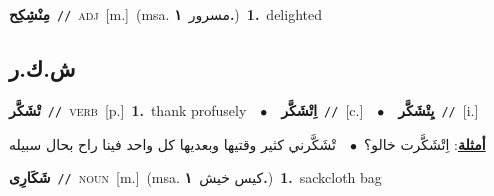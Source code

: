 \documentclass[10pt,a4paper,twoside]{article} %
\begin{document}
\begin{multicols}{2}
{\setlength\topsep{0pt}\textbf{\foreignlanguage{arabic}{مِنْشِكِح}}\ {\color{gray}\texttt{//}\color{black}}\ \textsc{adj}\ [m.]\ \color{gray}(msa. \foreignlanguage{arabic}{مسرور}~\foreignlanguage{arabic}{\textbf{١.}})\color{black}\ \textbf{1.}~delighted\ } \vspace{2mm}

\vspace{-3mm}
\subsection*{\color{blue}\foreignlanguage{arabic}{ش.ك.ر}\color{blue}{}} 

{\setlength\topsep{0pt}\textbf{\foreignlanguage{arabic}{تْشَكَّر}}\ {\color{gray}\texttt{//}\color{black}}\ \textsc{verb}\ [p.]\ \textbf{1.}~thank profusely\ \ $\bullet$\ \ \setlength\topsep{0pt}\textbf{\foreignlanguage{arabic}{اِتْشَكَّر}}\ {\color{gray}\texttt{//}\color{black}}\ [c.]\ \ $\bullet$\ \ \setlength\topsep{0pt}\textbf{\foreignlanguage{arabic}{يِتْشَكَّر}}\ {\color{gray}\texttt{//}\color{black}}\ [i.]\  \begin{flushright}\color{gray}\foreignlanguage{arabic}{\textbf{\underline{\foreignlanguage{arabic}{أمثلة}}}: اِتْشَكَّرت خالو؟\ $\bullet$\ \  تْشَكَّرني كثير وقتيها وبعديها كل واحد فينا راح بحال سبيله}\end{flushright}\color{black}} \vspace{2mm}

{\setlength\topsep{0pt}\textbf{\foreignlanguage{arabic}{شَكَارِى}}\ {\color{gray}\texttt{//}\color{black}}\ \textsc{noun}\ [m.]\ \color{gray}(msa. \foreignlanguage{arabic}{كيس خيش}~\foreignlanguage{arabic}{\textbf{١.}})\color{black}\ \textbf{1.}~sackcloth bag\ } \vspace{2mm}


\end{multicols}
\end{document}

